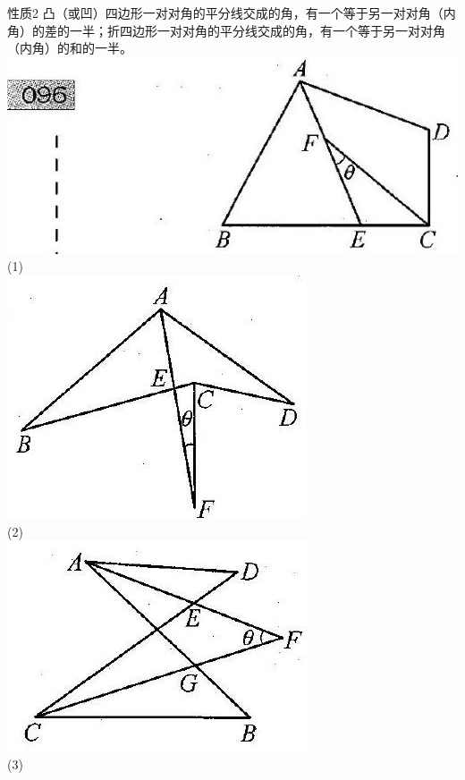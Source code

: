 \documentclass[10pt]{article}
\begin{document}
性质2 凸（或凹）四边形一对对角的平分线交成的角，有一个等于另一对对角（内角）的差的一半；折四边形一对对角的平分线交成的角，有一个等于另一对对角（内角）的和的一半。\\
\includegraphics[max width=\textwidth, center]{2024_10_30_2c8f45efd4a519b08e1ag-102(1)}\\
(1)\\
\includegraphics[max width=\textwidth, center]{2024_10_30_2c8f45efd4a519b08e1ag-102(2)}\\
(2)\\
\includegraphics[max width=\textwidth, center]{2024_10_30_2c8f45efd4a519b08e1ag-102}\\
(3)
\end{document}
